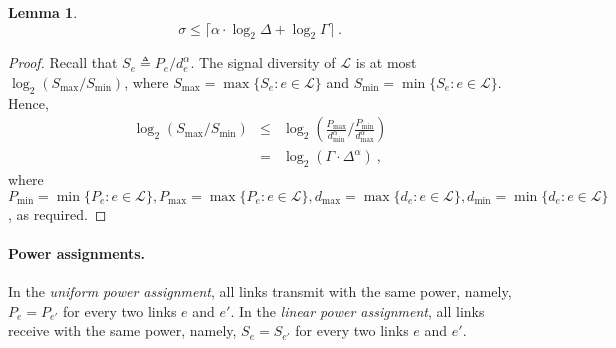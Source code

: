 \documentclass[11pt]{article}
\newenvironment{proof sketch}{\noindent {\bf Proof sketch:} }{\hfill \qed}
\newtheorem{lemma}{Lemma}
\newcommand{\LL}{\mathcal{L}}
\newcommand{\eqdf}{\triangleq}
\newcommand{\sigdiv}{\sigma}
\begin{document}
\begin{lemma}\label{lem:dive}
    $$\sigdiv \leq \lceil \alpha \cdot \log_2\Delta + \log_2 \Gamma \rceil\:.$$
\end{lemma}

\begin{proof}
    Recall that $S_e\eqdf P_e/d_e^\alpha$.
    The signal diversity of $\LL$ is at most
    $\log_2 (S_{\max}/S_{\min})$, where $S_{\max}= \max \{S_e : e \in \LL\}$ and $S_{\min} = \min \{S_e : e \in \LL\}$.
    Hence,
    \begin{eqnarray*}
        \log_2 (S_{\max}/S_{\min}) & \leq & \log_2 \left(\frac{P_{\max}}{d^{\alpha}_{\min}} / \frac{P_{\min}}{d^{\alpha}_{\max}}\right) \\
            & = & \log_2 (\Gamma \cdot \Delta^{\alpha})\:,
    \end{eqnarray*}
    where $P_{\min} = \min \{P_e : e \in \LL\}, P_{\max} = \max \{P_e : e \in \LL\}, d_{\max} = \max \{d_e : e \in \LL\}, d_{\min} = \min \{d_e : e \in \LL\}$, as required.
\end{proof}

\paragraph{Power assignments.}
In the \emph{uniform power assignment}, all links transmit with the same
power, namely, $P_e=P_{e'}$ for every two links $e$ and $e'$.
In the \emph{linear power assignment}, all links receive with the same
power, namely, $S_e=S_{e'}$ for every two links $e$ and $e'$.
\end{document}
